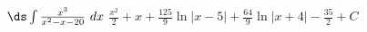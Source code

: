 {$\ds \int \frac{x^3}{x^2-x-20}\ dx$}
{$\frac{x^2}{2}+x+\frac{125}{9} \ln |x-5|+\frac{64}{9} \ln |x+4|-\frac{35}{2}+C$}
